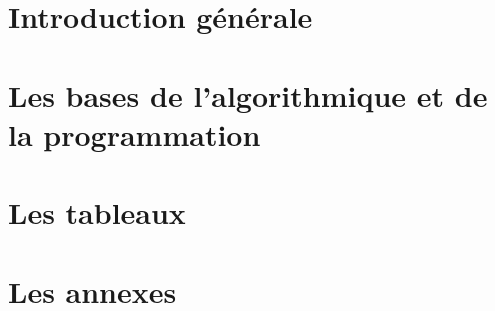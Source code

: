 \documentclass[a4paper,doubleside,11pt]{book}
\begin{document}

	
	
	

	\part{Introduction générale}	
		
		
		

	\part{Les bases de l'algorithmique et de la programmation}
		
		
		
		
		
		

	\part{Les tableaux}
		
		
			


	
	\part{Les annexes}
		
	
\end{document}
